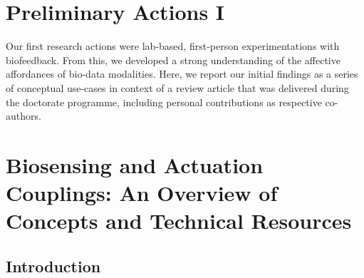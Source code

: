 \section{Preliminary Actions I}
\label{cha:Preliminary_Actions_sens_act}

Our first research actions were lab-based, first-person experimentations  with biofeedback. From this, we developed a strong understanding of the affective affordances of bio-data modalities. Here, we report our initial findings as a series of conceptual use-cases in context of a review article that was delivered during the doctorate programme, including personal contributions as respective co-authors.



\section[Biosensing and Actuation Couplings]{Biosensing and Actuation Couplings: An Overview of Concepts and Technical Resources}

\subsection{Introduction}

